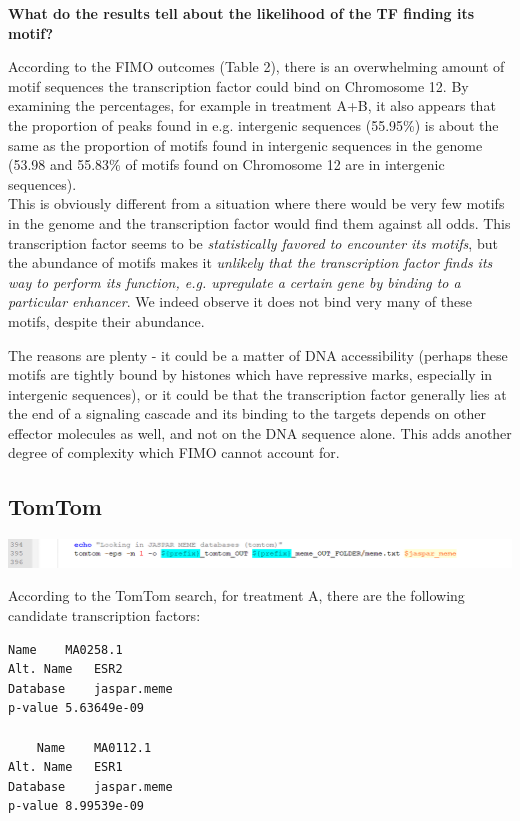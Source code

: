 \documentclass[a4paper,11pt]{article}
\begin{document}
\noindent \textbf{What do the results tell about the likelihood of the TF finding its motif?\\}

\noindent According to the FIMO outcomes (Table 2), there is an overwhelming amount of motif sequences the transcription factor could bind on Chromosome 12. By examining the percentages, for example in treatment A+B, it also appears that the proportion of peaks found in e.g. intergenic sequences (55.95\%) is about the same as the proportion of motifs found in intergenic sequences in the genome (53.98 and 55.83\% of motifs found on Chromosome 12 are in intergenic sequences).\\

\noindent This is obviously different from a situation where there would be very few motifs in the genome and the transcription factor would find them against all odds. This transcription factor seems to be \textit{statistically favored to encounter its motifs}, but the abundance of motifs makes it \textit{unlikely that the transcription factor finds its way to perform its function, e.g. upregulate a certain gene by binding to a particular enhancer}. We indeed observe it does not bind very many of these motifs, despite their abundance.

The reasons are plenty - it could be a matter of DNA accessibility (perhaps these motifs are tightly bound by histones which have repressive marks, especially in intergenic sequences), or it could be that the transcription factor generally lies at the end of a signaling cascade and its binding to the targets depends on other effector molecules as well, and not on the DNA sequence alone. This adds another degree of complexity which FIMO cannot account for.

\subsection{TomTom}

\noindent \includegraphics[scale=0.75]{tomtom.PNG}

\noindent According to the TomTom search, for treatment A, there are the following candidate transcription factors:
\begin{multicols}{2}
\begin{verbatim}
Name	MA0258.1				
Alt. Name	ESR2				
Database	jaspar.meme			
p-value	5.63649e-09

	Name	MA0112.1	
Alt. Name	ESR1
Database	jaspar.meme
p-value	8.99539e-09
\end{verbatim}
\end{multicols}
\end{document}
